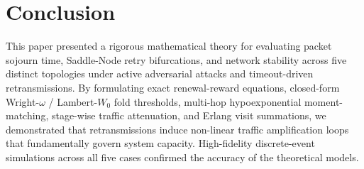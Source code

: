 \documentclass[journal,compsoc]{IEEEtran}
\begin{document}
\section{Conclusion}
This paper presented a rigorous mathematical theory for evaluating packet sojourn time, Saddle-Node retry bifurcations, and network stability across five distinct topologies under active adversarial attacks and timeout-driven retransmissions. By formulating exact renewal-reward equations, closed-form Wright-$\omega$ / Lambert-$W_0$ fold thresholds, multi-hop hypoexponential moment-matching, stage-wise traffic attenuation, and Erlang visit summations, we demonstrated that retransmissions induce non-linear traffic amplification loops that fundamentally govern system capacity. High-fidelity discrete-event simulations across all five cases confirmed the accuracy of the theoretical models.
\end{document}
